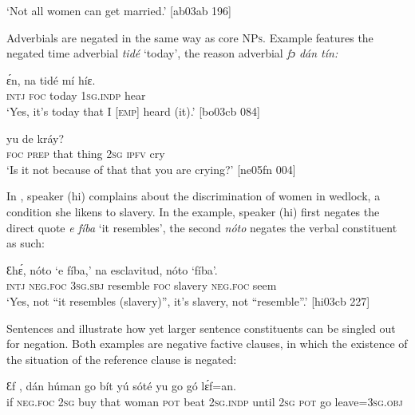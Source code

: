 \glt ‘Not all women can get married.’ [ab03ab 196]
\z

Adverbials are negated in the same way as core \textsc{NPs}. Example  features the negated time adverbial \textit{tidé} ‘today’,  the reason adverbial \textit{fɔ dán tín:} 


\ea%
    \label{ex:key:577}
    \gll ɛ́n,  na  tidé    mí    híɛ.\\
\textsc{intj}  \textsc{foc}  today  \textsc{1sg.indp}  hear\\

\glt ‘Yes, it’s today that I \textsc{[emp]} heard (it).’ [bo03cb 084]
\z


\ea%
    \label{ex:key:578}
    \gll {}            yu  de  kráy?\\
\textsc{foc}    \textsc{prep}  that    thing  \textsc{2sg}  \textsc{ipfv}  cry\\

\glt ‘Is it not because of that that you are crying?’ [ne05fn 004]
\z

In , speaker (hi) complains about the discrimination of women in wedlock, a condition she likens to slavery. In the example, speaker (hi) first negates the direct quote\textit{ e fíba} ‘it resembles’, the second \textit{nóto} negates the verbal constituent as such: 


\ea%
    \label{ex:key:579}
    \gll Ɛhɛ́,    nóto    ‘e    fíba,’  na  esclavitud,  nóto  ‘fíba’.\\
\textsc{intj}    \textsc{neg}.\textsc{foc}  \textsc{3sg.sbj}  resemble    \textsc{foc}  slavery    \textsc{neg}.\textsc{foc}  seem\\

\glt ‘Yes, not “it resembles (slavery)”, it’s slavery, not “resemble”.’ [hi03cb 227]
\z

Sentences  and  illustrate how yet larger sentence constituents can be singled out for negation. Both examples are negative factive clauses, in which the existence of the situation of the reference clause is negated:


\ea%
    \label{ex:key:580}
    \gll Ɛf        ,    dán  húman  go  bít  yú
sóté    yu  go  gó  lɛ́f=an.\\
if  \textsc{neg}.\textsc{foc}  \textsc{2sg}  buy    that  woman  \textsc{pot}  beat  \textsc{2sg.indp}
until  \textsc{2sg}  \textsc{pot}  go  leave=\textsc{3sg.obj}\\

